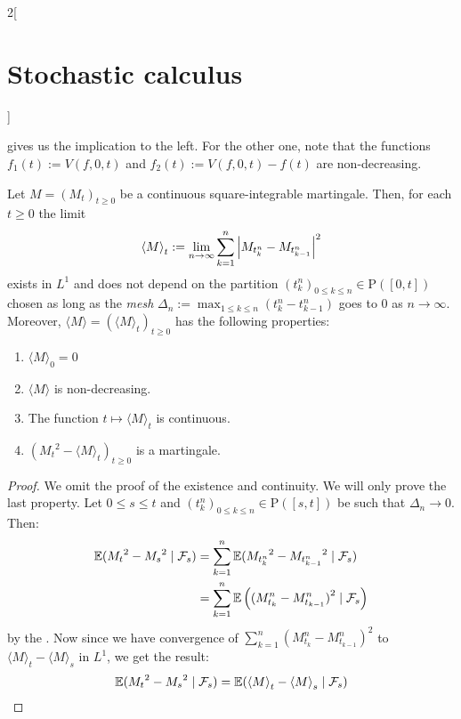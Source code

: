\documentclass[../../../main_math.tex]{subfiles}
\begin{document}
\begin{multicols}{2}[\section{Stochastic calculus}]
\begin{proposition}
  \end{proposition}
  \begin{sproof}
     gives us the implication to the left. For the other one, note that the functions $f_1(t):=V(f,0,t)$ and $f_2(t):=V(f,0,t)-f(t)$ are non-decreasing.
  \end{sproof}
  \begin{theorem}
    Let $M={(M_t)}_{t\geq 0}$ be a continuous square-integrable martingale. Then, for each $t\geq 0$ the limit
    $$
      {\langle M\rangle}_t:=\lim_{n\to\infty}\sum_{k=1}^{n}\abs{M_{t_k^n}-M_{t_{k-1}^n}}^2
    $$
    exists in $L^1$ and does not depend on the partition ${(t_k^n)}_{0\leq k\leq n}\in \mathrm{P}([0,t])$ chosen as long as the \emph{mesh} $\Delta_n:= \max_{1\leq k\leq n}(t_k^n-t_{k-1}^n)$ goes to $0$ as $n\to\infty$. Moreover, $\langle M\rangle=({\langle M\rangle}_t)_{t\geq 0}$ has the following properties:
    \begin{enumerate}
      \item\label{SC:quad_var1} ${\langle M\rangle}_0=0$
      \item\label{SC:quad_var2} $\langle M\rangle$ is non-decreasing.
      \item\label{SC:quad_var3} The function $t\mapsto {\langle M\rangle}_t$ is continuous.
      \item\label{SC:quad_var4} ${({M_t}^2-{\langle M\rangle}_t)}_{t\geq 0}$ is a martingale.
    \end{enumerate}
  \end{theorem}
  \begin{proof}
    We omit the proof of the existence and continuity. We will only prove the last property. Let $0\leq s\leq t$ and ${(t_k^n)}_{0\leq k\leq n}\in \mathrm{P}([s,t])$ be such that $\Delta_n\to 0$. Then:
    \begin{align*}
      \mathbb{E}({M_t}^2-{M_s}^2\mid \mathcal{F}_s) & =\sum_{k=1}^n \mathbb{E}({M_{t_k^n}}^2-{M_{t_{k-1}^n}}^2\mid \mathcal{F}_s)          \\
                                              & =\sum_{k=1}^n \mathbb{E}\left({(M_{t_k}^n-M_{t_{k-1}}^n)}^2\mid \mathcal{F}_s\right) \\
    \end{align*}
    by the . Now since we have convergence of $\sum_{k=1}^{n}{(M_{t_k}^n-M_{t_{k-1}}^n)}^2$ to ${\langle M\rangle}_t-{\langle M\rangle}_s$ in $L^1$, we get the result:
    $$
      \mathbb{E}({M_t}^2-{M_s}^2\mid \mathcal{F}_s)=\mathbb{E}({\langle M\rangle}_t-{\langle M\rangle}_s\mid \mathcal{F}_s)
$$
\end{proof}
\end{multicols}
\end{document}
